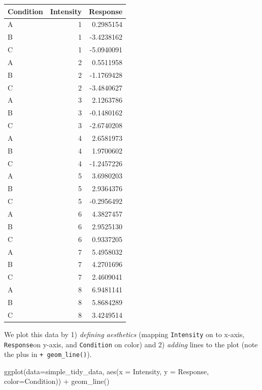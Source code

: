 \documentclass[
]{book}
\newenvironment{Shaded}{\begin{snugshade}}{\end{snugshade}}
\newcommand{\AttributeTok}[1]{\textcolor[rgb]{0.77,0.63,0.00}{#1}}
\newcommand{\FunctionTok}[1]{\textcolor[rgb]{0.00,0.00,0.00}{#1}}
\newcommand{\NormalTok}[1]{#1}
\newcommand{\SpecialCharTok}[1]{\textcolor[rgb]{0.00,0.00,0.00}{#1}}
\begin{document}
\begin{tabular}{l|r|r}
\hline
Condition & Intensity & Response\\
\hline
A & 1 & 0.2985154\\
\hline
B & 1 & -3.4238162\\
\hline
C & 1 & -5.0940091\\
\hline
A & 2 & 0.5511958\\
\hline
B & 2 & -1.1769428\\
\hline
C & 2 & -3.4840627\\
\hline
A & 3 & 2.1263786\\
\hline
B & 3 & -0.1480162\\
\hline
C & 3 & -2.6740208\\
\hline
A & 4 & 2.6581973\\
\hline
B & 4 & 1.9700602\\
\hline
C & 4 & -1.2457226\\
\hline
A & 5 & 3.6980203\\
\hline
B & 5 & 2.9364376\\
\hline
C & 5 & -0.2956492\\
\hline
A & 6 & 4.3827457\\
\hline
B & 6 & 2.9525130\\
\hline
C & 6 & 0.9337205\\
\hline
A & 7 & 5.4958032\\
\hline
B & 7 & 4.2701696\\
\hline
C & 7 & 2.4609041\\
\hline
A & 8 & 6.9481141\\
\hline
B & 8 & 5.8684289\\
\hline
C & 8 & 3.4249514\\
\hline
\end{tabular}

We plot this data by 1) \emph{defining aesthetics} (mapping \texttt{Intensity} on to x-axis, \texttt{Response}on y-axis, and \texttt{Condition} on color) and 2) \emph{adding} lines to the plot (note the plus in \texttt{+\ geom\_line()}).

\begin{Shaded}
\begin{Highlighting}[]
\FunctionTok{ggplot}\NormalTok{(}\AttributeTok{data=}\NormalTok{simple\_tidy\_data, }\FunctionTok{aes}\NormalTok{(}\AttributeTok{x =}\NormalTok{ Intensity, }\AttributeTok{y =}\NormalTok{ Response, }\AttributeTok{color=}\NormalTok{Condition)) }\SpecialCharTok{+} 
  \FunctionTok{geom\_line}\NormalTok{()}
\end{Highlighting}
\end{Shaded}
\end{document}
